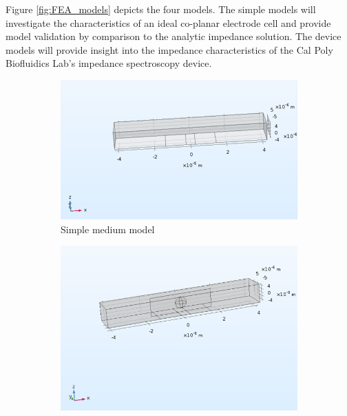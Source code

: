 \par Figure \ref{fig:FEA_models} depicts the four models. The simple models will investigate the characteristics of an ideal co-planar electrode cell and provide model validation by comparison to the analytic impedance solution. The device models will provide insight into the impedance characteristics of the Cal Poly Biofluidics Lab's impedance spectroscopy device. 

\begin{figure}[h]
    \centering
    \begin{subfigure}[b]{0.45\textwidth}
        \centering
        \includegraphics[width=\textwidth]{images/simpleMediumGeometry.png}
        \caption{Simple medium model}
        \label{fig:simple_medium_fea_model}
    \end{subfigure}
    \hfill
    \begin{subfigure}[b]{0.45\textwidth}
        \centering
        \includegraphics[width=\textwidth]{images/simpleCellGeometry.png}

\end{subfigure}
\end{figure}
